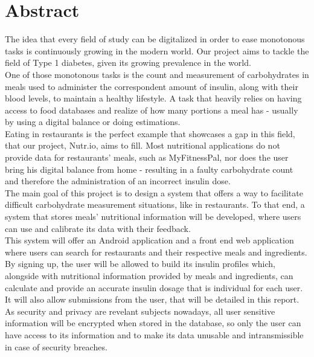 %
%

\chapter*{Abstract}
    The idea that every field of study can be digitalized in order to ease 
    monotonous tasks is continuously growing in the modern world. Our project
    aims to tackle the field of Type 1 diabetes, given its growing prevalence in the world.\\

    One of those monotonous tasks is the count and measurement of carbohydrates in meals used to
    administer the correspondent amount of insulin, along with their blood levels, to maintain a healthy lifestyle.
    A task that heavily relies on having access to food databases and realize of how many portions a meal has - usually
    by using a digital balance or doing estimations.\\

    Eating in restaurants is the perfect example that showcases a gap in this field, that our project, 
    Nutr.io, aims to fill.  Most nutritional applications do not provide data for restaurants' meals,
    such as MyFitnessPal, nor does the user bring his digital balance from home - resulting in a faulty
    carbohydrate count and therefore the administration of an incorrect insulin dose.\\

    The main goal of this project is to design a system that offers a way to facilitate difficult
    carbohydrate measurement situations, like in restaurants.
    To that end, a system that stores meals' nutritional information will be developed, 
    where users can use and calibrate its data with their feedback.\\

    This system will offer an Android application and a front end web application where users can search for 
    restaurants and their respective meals and ingredients. By signing up, the user will be allowed to build
    its insulin profiles which, alongside with nutritional information provided by meals and ingredients,
    can calculate and provide an accurate insulin dosage that is individual for each user. It will also allow 
    submissions from the user, that will be detailed in this report.\\

    As security and privacy are revelant subjects nowadays, all user sensitive information will be 
    encrypted when stored in the database, so only the user can have access to its information and to 
    make its data unusable and intransmissible in case of security breaches.